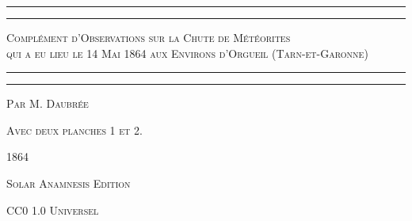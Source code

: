 \documentclass[a4paper, 11pt, oneside, polutonikogreek, french]{article}
\begin{document}
\begin{titlepage} %
	\centering %

	
	\rule{\textwidth}{1.6pt}\vspace*{-\baselineskip}\vspace*{2pt} %
	\rule{\textwidth}{0.4pt} %
	
	\vspace{1\baselineskip} %
	
	{\scshape\Huge Complément d'Observations sur la Chute de Météorites\\ qui a eu lieu le 14 Mai 1864 aux Environs d'Orgueil (Tarn-et-Garonne)}
	
	\vspace{1\baselineskip} %

	\rule{\textwidth}{0.4pt}\vspace*{-\baselineskip}\vspace{3.2pt} %
	\rule{\textwidth}{1.6pt} %
	
	\vspace{1\baselineskip} %
	
	
	
	{\scshape Par \Large M. Daubrée} %
	
	\vspace*{1\baselineskip} %
	
    {\scshape\scriptsize Avec deux planches 1 et 2.} %
    
    \vspace*{\fill}

	\vspace{1\baselineskip}

	{\small\scshape 1864}
	
	\vspace{0.5\baselineskip} %

    {\small\scshape Solar Anamnesis Edition} %
	
	{\scshape\small CC0 1.0 Universel} %
\end{titlepage}
\setlength{\parskip}{1mm plus1mm minus1mm}
\clearpage
\end{document}
